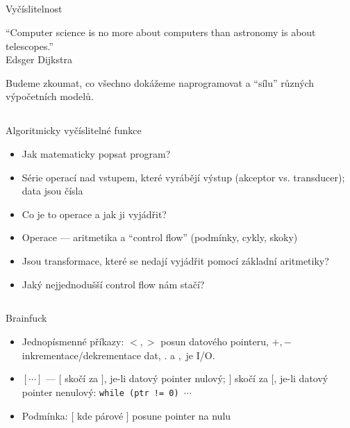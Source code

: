 \documentclass{beamer}
\begin{document}
\subsection{}
\begin{frame}{Vyčíslitelnost}
\begin{center}
``Computer science is no more about computers than astronomy is about telescopes.'' \\
Edsger Dijkstra
\end{center}

Budeme zkoumat, co všechno dokážeme naprogramovat a ``sílu'' různých výpočetních modelů.
\end{frame}

\subsection{}
\begin{frame}{Algoritmicky vyčíslitelné funkce}
\begin{itemize}
\item Jak matematicky popsat program?
\pause
\item Série operací nad vstupem, které vyrábějí výstup (akceptor vs. transducer); data jsou čísla
\item Co je to operace a jak ji vyjádřit?
\pause
\item Operace --- aritmetika a ``control flow'' (podmínky, cykly, skoky)
\item Jsou transformace, které se nedají vyjádřit pomocí základní aritmetiky?
\item Jaký nejjednodušší control flow nám stačí?
\end{itemize}
\end{frame}

\subsection{}
\begin{frame}{Brainfuck}
\begin{itemize}
\item Jednopísmenné příkazy: $<, >$ posun datového pointeru, $+, -$ inkrementace/dekrementace dat, $.$ a $,$ je I/O.
\item $[\cdots]$ --- $[$ skočí za $]$, je-li datový pointer nulový; $]$ skočí za $[$, je-li datový pointer nenulový:
	{\tt while (ptr != 0) $\cdots$}
\pause
\item Podmínka: $[$ kde párové $]$ posune pointer na nulu
\end{itemize}
\end{frame}
\end{document}
